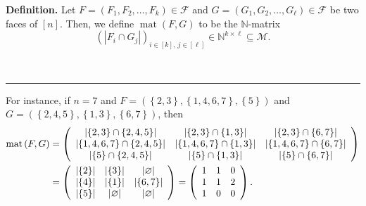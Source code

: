\documentclass[12pt]{article}
\theoremstyle{definition}%
\theoremstyle{definition}%
\newtheorem{defn}[thm]{Definition}
\theoremstyle{remark}%
\newcommand{\interval}[1]{\left[ #1 \right]} %
\newcommand{\CF}{\mathcal{F}}
\newcommand{\CM}{\mathcal{M}}
\newcommand{\mat}{\operatorname{mat}}
\newenvironment{defn}[1][Definition]{\noindent\textbf{#1.} }{\ \rule{0.5em}{0.5em}}
\begin{document}
\begin{defn}
\label{def.face-int-mat}Let $F=\left(  F_{1},F_{2},\ldots,F_{k}\right)
\in\CF $ and $G=\left(  G_{1},G_{2},\ldots,G_{\ell}\right)
\in\CF $ be two faces of $\interval{n}$. Then, we define
$\mat\left(  F,G\right)  $ to be the $\mathbb{N}$-matrix
\[
\left(  \left\vert F_{i}\cap G_{j}\right\vert \right)  _{i\in\interval{k}
,\ j\in\interval{\ell}}\in\mathbb{N}^{k\times\ell}\subseteq\CM.
\]

\end{defn}

For instance, if $n=7$ and $F=\left(  \left\{  2,3\right\}  ,\left\{
1,4,6,7\right\}  ,\left\{  5\right\}  \right)  $ and $G=\left(  \left\{
2,4,5\right\}  ,\left\{  1,3\right\}  ,\left\{  6,7\right\}  \right)  $, then
\begin{align*}
\mat\left(  F,G\right)   &  =\left(
\begin{array}[c]{ccc}
\left\vert \left\{  2,3\right\}  \cap\left\{  2,4,5\right\}  \right\vert  &
\left\vert \left\{  2,3\right\}  \cap\left\{  1,3\right\}  \right\vert  &
\left\vert \left\{  2,3\right\}  \cap\left\{  6,7\right\}  \right\vert \\
\left\vert \left\{  1,4,6,7\right\}  \cap\left\{  2,4,5\right\}  \right\vert
& \left\vert \left\{  1,4,6,7\right\}  \cap\left\{  1,3\right\}  \right\vert
& \left\vert \left\{  1,4,6,7\right\}  \cap\left\{  6,7\right\}  \right\vert
\\
\left\vert \left\{  5\right\}  \cap\left\{  2,4,5\right\}  \right\vert  &
\left\vert \left\{  5\right\}  \cap\left\{  1,3\right\}  \right\vert  &
\left\vert \left\{  5\right\}  \cap\left\{  6,7\right\}  \right\vert
\end{array}
\right) \\
&  =\left(
\begin{array}[c]{ccc}
\left\vert \left\{  2\right\}  \right\vert  & \left\vert \left\{  3\right\}
\right\vert  & \left\vert \varnothing\right\vert \\
\left\vert \left\{  4\right\}  \right\vert  & \left\vert \left\{  1\right\}
\right\vert  & \left\vert \left\{  6,7\right\}  \right\vert \\
\left\vert \left\{  5\right\}  \right\vert  & \left\vert \varnothing
\right\vert  & \left\vert \varnothing\right\vert
\end{array}
\right)  =\left(
\begin{array}[c]{ccc}
1 & 1 & 0\\
1 & 1 & 2\\
1 & 0 & 0
\end{array}
\right)  .
\end{align*}
\end{document}
